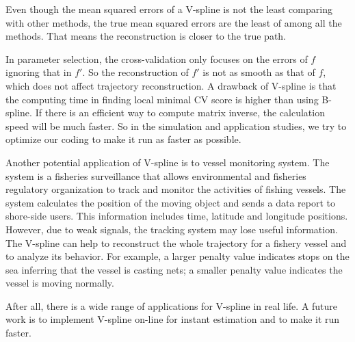 Even though the mean squared errors of a V-spline is not the least comparing with other methods, the true mean squared errors are the least of among all the methods. That means the reconstruction is closer to the true path. 

In parameter selection, the cross-validation only focuses on the errors of $f$ ignoring that in $f'$. So the reconstruction of $f'$ is not as smooth as that of $f$, which does not affect trajectory reconstruction. A drawback of V-spline is that the computing time in finding local minimal CV score is higher than using B-spline. If there is an efficient way to compute matrix inverse, the calculation speed will be much faster. So in the simulation and application studies, we try to optimize our coding to make it run as faster as possible.

Another potential application of V-spline is to vessel monitoring system. The system is a fisheries surveillance that allows environmental and fisheries regulatory organization to track and monitor the activities of fishing vessels. The system calculates the position of the moving object and sends a data report to shore-side users. This information includes time, latitude and longitude positions. However, due to weak signals, the tracking system may lose useful information. The V-spline can help to reconstruct the whole trajectory for a fishery vessel and to analyze its behavior. For example, a larger penalty value indicates stops on the sea inferring that the vessel is casting nets; a smaller penalty value indicates the vessel is moving normally. 

After all, there is a wide range of applications for V-spline in real life. A future work is to implement V-spline on-line for instant estimation and to make it run faster. 

